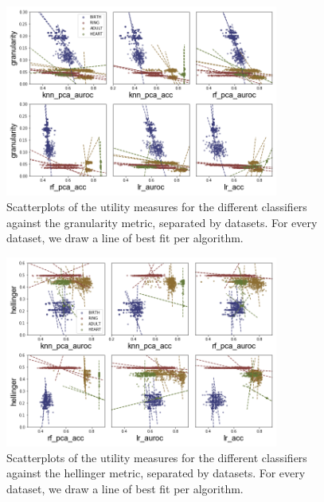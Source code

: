 \begin{figure}[!ht]
    \centering
    \includegraphics[width=0.8\textwidth]{project/fig/scatter_sep_trends/granularity_scatter.png}
    \caption{Scatterplots of the utility measures for the different classifiers against the granularity metric, separated by datasets. For every dataset, we draw a line of best fit per algorithm.}
\end{figure}

\begin{figure}[!ht]
    \centering
    \includegraphics[width=0.8\textwidth]{project/fig/scatter_sep_trends/hellinger_scatter.png}
    \caption{Scatterplots of the utility measures for the different classifiers against the hellinger metric, separated by datasets. For every dataset, we draw a line of best fit per algorithm.}
\end{figure}

